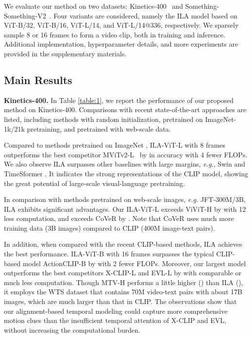 \documentclass[10pt,twocolumn,letterpaper]{article}
\begin{document}
We evaluate our method on two datasets: Kinetics-400~\cite{b46} and Something-Something-V2~\cite{b47}.
Four variants are considered, namely the ILA model based on ViT-B/32, ViT-B/16, ViT-L/14, and ViT-L/14@336, respectively.
We sparsely sample 8 or 16 frames to form a video clip, both in training and inference.
Additional implementation, hyperparameter details, and more experiments are provided in the supplementary materials.

\subsection{Main Results}

\noindent \textbf{Kinetics-400.} In Table \ref{table:1}, we report the performance of our proposed method on Kinetics-400. 
Comparisons with recent state-of-the-art approaches are listed, including methods with random initialization, pretrained on ImageNet-1k/21k pretraining, and pretrained with web-scale data.

Compared to methods pretrained on ImageNet \cite{deng2009imagenet}, ILA-ViT-L with 8 frames outperforms the best competitor MViTv2-L~\cite{b48} by  in accuracy with 4 fewer FLOPs. 
We also observe ILA surpasses other baselines with large margins, \emph{e.g.}, Swin \cite{b15} and TimeSformer \cite{b13}.
It indicates the strong representations of the CLIP model, showing the great potential of large-scale visual-language pretraining.


In comparison with methods pretrained on web-scale images, \emph{e.g.} JFT-300M/3B, ILA exhibits significant advantages. Our ILA-ViT-L exceeds ViViT-H by  with 12 less computation, and exceeds CoVeR by . Note that CoVeR uses much more training data (3B images) compared to CLIP (400M image-text pairs).



In addition, when compared with the recent CLIP-based methods, ILA achieves the best performance.
ILA-ViT-B with 16 frames surpasses the typical CLIP-based model ActionCLIP-B by  with 2 fewer FLOPs.
Moreover, our largest model outperforms the best competitors X-CLIP-L and EVL-L by  with comparable or much less computation.
Though MTV-H performs a little higher () than ILA (), it employs the WTS dataset that contains 70M video-text pairs with about 17B images, which are much larger than that in CLIP. 
The observations show that our alignment-based temporal modeling could capture more comprehensive motion clues than the insufficient temporal attention of X-CLIP and EVL, without increasing the computational burden.
\end{document}
